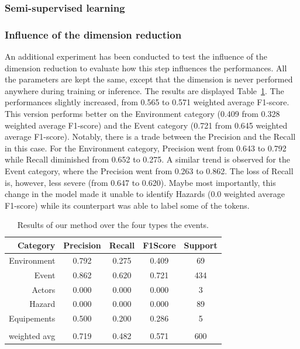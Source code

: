 \subsubsection{Semi-supervised learning}

\subsubsection{Influence of the dimension reduction}
An additional experiment has been conducted to test the influence of the dimension reduction to evaluate how this step influences the performances.
All the parameters are kept the same, except that the dimension is never performed anywhere during training or inference.
The results are displayed Table~\ref{table:overall-results-nodim}.
The performances slightly increased, from 0.565 to 0.571 weighted average F1-score.
This version performs better on the Environment category (0.409 from 0.328 weighted average F1-score) and the Event category (0.721 from 0.645 weighted average F1-score).
Notably, there is a trade between the Precision and the Recall in this case.
For the Environment category, Precision went from 0.643 to 0.792 while Recall diminished from 0.652 to 0.275.
A similar trend is observed for the Event category, where the Precision went from 0.263 to 0.862.
The loss of Recall is, however, less severe (from 0.647 to 0.620).
Maybe most importantly, this change in the model made it unable to identify Hazards (0.0 weighted average F1-score) while its counterpart was able to label some of the tokens.

\begin{table}[bp]
    \centering
    \caption{Results of our method over the four types the events.}
    \begin{tabular}{rcccc}
        Category     & Precision & Recall & F1\-Score & Support \\
        \toprule
        Environment  & 0.792     & 0.275  & 0.409     & 69      \\
        Event        & 0.862     & 0.620  & 0.721     & 434     \\
        Actors       & 0.000     & 0.000  & 0.000     & 3       \\
        Hazard       & 0.000     & 0.000  & 0.000     & 89      \\
        Equipements  & 0.500     & 0.200  & 0.286     & 5       \\
                     &           &        &           &         \\
        weighted avg & 0.719     & 0.482  & 0.571     & 600     \\
        \bottomrule
    \end{tabular}
    \label{table:overall-results-nodim}
\end{table}

